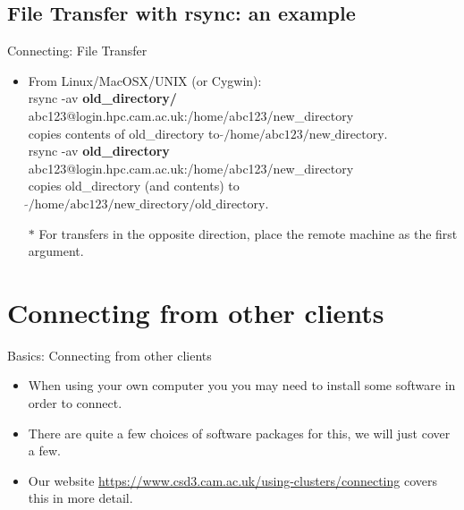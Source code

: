 \subsection{File Transfer with rsync: an example}
\begin{frame}{Connecting: File Transfer}
\begin{itemize}
\item From Linux/MacOSX/UNIX (or Cygwin):\hfill\\
\alert{\footnotesize rsync -av \textbf{old\_directory/} abc123@login.hpc.cam.ac.uk:/home/abc123/new\_directory}\hfill\\
copies contents of old\_directory to $\tilde{}\text{/home/abc123/new\_directory}$.\hfill\\\smallskip
\pause
\alert{\footnotesize rsync -av \textbf{old\_directory} abc123@login.hpc.cam.ac.uk:/home/abc123/new\_directory}\hfill\\
copies old\_directory (and contents) to $\tilde{}\text{/home/abc123/new\_directory/old\_directory}$.\hfill\\
\pause
\item[$\ast$]For transfers in the opposite direction, place the remote machine as the first argument.
\end{itemize}
\end{frame}
%
\section{Connecting from other clients}
\begin{frame}{Basics: Connecting from other clients}
\begin{itemize}
\item{When using your own computer you you may need to install some software in order to connect.}
\pause
\item{There are quite a few choices of software packages for this, we will just cover a few.}
\pause
\item{Our website \url{https://www.csd3.cam.ac.uk/using-clusters/connecting} covers this in more detail.}
\end{itemize}
\end{frame}

